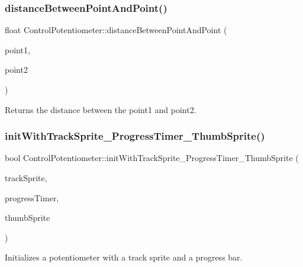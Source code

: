 \subsubsection{\texorpdfstring{distance\+Between\+Point\+And\+Point()}{distanceBetweenPointAndPoint()}\hspace{0.1cm}{\footnotesize\ttfamily [2/2]}}
{\footnotesize\ttfamily float Control\+Potentiometer\+::distance\+Between\+Point\+And\+Point (\begin{DoxyParamCaption}\item[{\hyperlink{classVec2}{Vec2}}]{point1,  }\item[{\hyperlink{classVec2}{Vec2}}]{point2 }\end{DoxyParamCaption})}

Returns the distance between the point1 and point2. \mbox{\label{classControlPotentiometer_afac9c374d17a3eb0b1135ae0e0b55678}} 
\subsubsection{\texorpdfstring{init\+With\+Track\+Sprite\+\_\+\+Progress\+Timer\+\_\+\+Thumb\+Sprite()}{initWithTrackSprite\_ProgressTimer\_ThumbSprite()}\hspace{0.1cm}{\footnotesize\ttfamily [1/2]}}
{\footnotesize\ttfamily bool Control\+Potentiometer\+::init\+With\+Track\+Sprite\+\_\+\+Progress\+Timer\+\_\+\+Thumb\+Sprite (\begin{DoxyParamCaption}\item[{\hyperlink{classSprite}{Sprite} $\ast$}]{track\+Sprite,  }\item[{\hyperlink{classProgressTimer}{Progress\+Timer} $\ast$}]{progress\+Timer,  }\item[{\hyperlink{classSprite}{Sprite} $\ast$}]{thumb\+Sprite }\end{DoxyParamCaption})}

Initializes a potentiometer with a track sprite and a progress bar.


